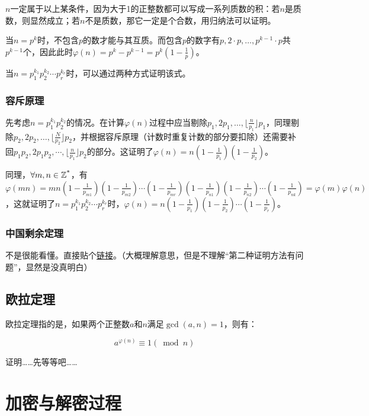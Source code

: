 \documentclass[a4paper]{article}  %
\begin{document}
$n$一定属于以上某条件，因为大于1的正整数都可以写成一系列质数的积：若$n$是质数，则显然成立；若$n$不是质数，那它一定是个合数，用归纳法可以证明。

当$n = p^k$时，不包含$p$的数才能与其互质。而包含$p$的数字有$p,2\cdot p,\ldots ,p^{k-1}\cdot p$共$p^{k-1}$个，因此此时$\varphi(n) = p^k - p^{k-1} = p^k (1 - \frac{1}{p} )$。

当$n = p_{1}^{k_1}p_{2}^{k_2}\cdots p_{r}^{k_r}$时，可以通过两种方式证明该式。

\subsubsection{容斥原理}

先考虑$n = p_{1}^{k_1}p_{2}^{k_2}$的情况。在计算$\varphi(n)$过程中应当剔除$p_1, 2p_1, \ldots, \lfloor \frac{n}{p_1} \rfloor p_1$，同理剔除$p_2, 2p_2, \ldots, \lfloor \frac{N}{p_2} \rfloor p_2$，并根据容斥原理（计数时重复计数的部分要扣除）还需要补回$p_1p_2, 2p_1p_2, \cdots, \lfloor \frac{n}{p_1} \rfloor p_2$的部分。这证明了$\varphi(n)=n(1-\frac{1}{p_1})(1-\frac{1}{p_2})$。

同理，$\forall m, n \in \mathbb{Z\textsuperscript{*}}$，有$\varphi(mn)=mn(1-\frac{1}{p_{m1}})(1-\frac{1}{p_{m2}}) \cdots (1-\frac{1}{p_{mr}})(1-\frac{1}{p_{n1}})(1-\frac{1}{p_{n2}}) \cdots (1-\frac{1}{p_{nk}})=\varphi(m)\varphi(n)$，这就证明了$n = p_{1}^{k_1}p_{2}^{k_2}\cdots p_{r}^{k_r}$时，$\varphi(n)=n(1-\frac{1}{p_1})(1-\frac{1}{p_2})\cdots (1-\frac{1}{p_r})$。

\subsubsection{中国剩余定理}

不是很能看懂。直接贴个\href{https://zhuanlan.zhihu.com/p/600282116}{链接}。（大概理解意思，但是不理解“第二种证明方法有问题”，显然是没真明白）

\subsection[欧拉定理]{欧拉定理}

欧拉定理指的是，如果两个正整数$a$和$n$满足$\gcd(a, n) = 1$，则有：

\[
	a^{\varphi(n)} \equiv 1 (\bmod n)
\]

证明……先等等吧……
\section[算法描述]{加密与解密过程} \label{加密与解密过程}
\end{document}
